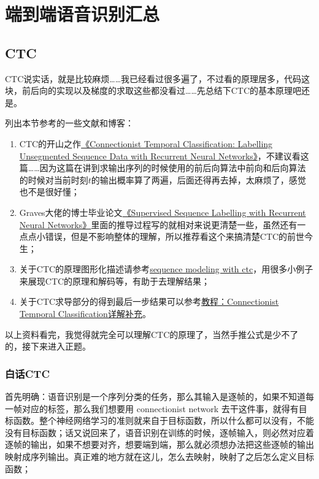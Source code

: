 \chapter{端到端语音识别汇总}
\section{CTC}
CTC说实话，就是比较麻烦……我已经看过很多遍了，不过看的原理居多，代码这块，前后向的实现以及梯度的求取这些都没看过……先总结下CTC的基本原理吧还是。

列出本节参考的一些文献和博客：
\begin{enumerate}
  \item CTC的开山之作\href{http://www.cs.toronto.edu/~graves/icml_2006.pdf}{《Connectionist Temporal Classification: Labelling Unsegmented Sequence Data with Recurrent Neural Networks》}，不建议看这篇……因为这篇在讲到求输出序列的时候使用的前后向算法中前向和后向算法的时候对当前时刻$t$的输出概率算了两遍，后面还得再去掉，太麻烦了，感觉也不是很好懂；
  \item Graves大佬的博士毕业论文\href{https://www.cs.toronto.edu/~graves/preprint.pdf}{《Supervised Sequence Labelling with Recurrent Neural Networks》}里面的推导过程写的就相对来说更清楚一些，虽然还有一点点小错误，但是不影响整体的理解，所以推荐看这个来搞清楚CTC的前世今生；
  \item 关于CTC的原理图形化描述请参考\href{https://distill.pub/2017/ctc/}{sequence modeling with ctc}，用很多小例子来展现CTC的原理和解码等，有助于去理解结果；
  \item 关于CTC求导部分的得到最后一步结果可以参考\href{https://blog.csdn.net/w5688414/article/details/77867786}{教程：Connectionist Temporal Classification详解补充}。
\end{enumerate}

以上资料看完，我觉得就完全可以理解CTC的原理了，当然手推公式是少不了的，接下来进入正题。
\subsection{白话CTC}
首先明确：语音识别是一个序列分类的任务，那么其输入是逐帧的，如果不知道每一帧对应的标签，那么我们想要用 connectionist network 去干这件事，就得有目标函数。整个神经网络学习的准则就来自于目标函数，所以什么都可以没有，不能没有目标函数；话又说回来了，语音识别在训练的时候，逐帧输入，则必然对应着逐帧的输出，如果不想要对齐，想要端到端，那么就必须想办法把这些逐帧的输出映射成序列输出。真正难的地方就在这儿，怎么去映射，映射了之后怎么定义目标函数；

